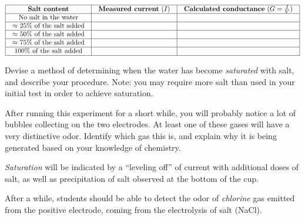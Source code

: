 \vskip 10pt


\vbox{\offinterlineskip
{} %
} %




$$\vbox{\offinterlineskip
\halign{\strut
\vrule \quad\hfil # \ \hfil & 
\vrule \quad\hfil # \ \hfil & 
\vrule \quad\hfil # \ \hfil \vrule \cr
\noalign{\hrule}
%
{\bf Salt content} & {\bf Measured current} ($I$) & {\bf Calculated conductance} ($G = {I \over V}$) \cr
%
\noalign{\hrule}
%
No salt in the water &  & \cr
%
\noalign{\hrule}
%
$\approx$ 25\% of the salt added &  & \cr
%
\noalign{\hrule}
%
$\approx$ 50\% of the salt added &  & \cr
%
\noalign{\hrule}
%
$\approx$ 75\% of the salt added  &  & \cr
%
\noalign{\hrule}
%
100\% of the salt added &  & \cr
%
\noalign{\hrule}
} %
}$$ %

\vskip 10pt

Devise a method of determining when the water has become {\it saturated} with salt, and describe your procedure.  Note: you may require more salt than used in your initial test in order to achieve saturation.

\vskip 10pt

After running this experiment for a short while, you will probably notice a lot of bubbles collecting on the two electrodes.  At least one of these gases will have a very distinctive odor.  Identify which gas this is, and explain why it is being generated based on your knowledge of chemistry.














{\it Saturation} will be indicated by a ``leveling off'' of current with additional doses of salt, as well as precipitation of salt observed at the bottom of the cup.

\vskip 10pt

After a while, students should be able to detect the odor of {\it chlorine} gas emitted from the positive electrode, coming from the electrolysis of salt (NaCl).




